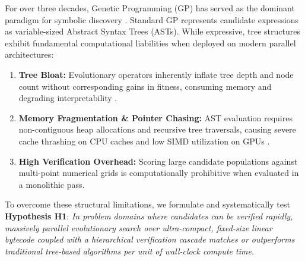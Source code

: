 \documentclass[11pt,a4paper]{article}
\begin{document}
For over three decades, Genetic Programming (GP) has served as the dominant paradigm for symbolic discovery \cite{koza1992genetic, poli2008field}. Standard GP represents candidate expressions as variable-sized Abstract Syntax Trees (ASTs). While expressive, tree structures exhibit fundamental computational liabilities when deployed on modern parallel architectures:
\begin{enumerate}
    \item \textbf{Tree Bloat:} Evolutionary operators inherently inflate tree depth and node count without corresponding gains in fitness, consuming memory and degrading interpretability \cite{poli2008field}.
    \item \textbf{Memory Fragmentation \& Pointer Chasing:} AST evaluation requires non-contiguous heap allocations and recursive tree traversals, causing severe cache thrashing on CPU caches and low SIMD utilization on GPUs \cite{langdon2008simd}.
    \item \textbf{High Verification Overhead:} Scoring large candidate populations against multi-point numerical grids is computationally prohibitive when evaluated in a monolithic pass.
\end{enumerate}

To overcome these structural limitations, we formulate and systematically test \textbf{Hypothesis H1}: \textit{In problem domains where candidates can be verified rapidly, massively parallel evolutionary search over ultra-compact, fixed-size linear bytecode coupled with a hierarchical verification cascade matches or outperforms traditional tree-based algorithms per unit of wall-clock compute time.}
\end{document}

